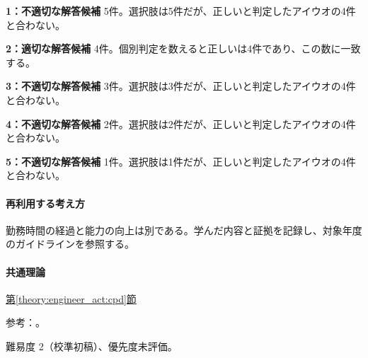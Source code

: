 \noindent\textbf{1：不適切な解答候補} 5件。選択肢は5件だが、正しいと判定したアイウオの4件と合わない。\par

\noindent\textbf{2：適切な解答候補} 4件。個別判定を数えると正しいは4件であり、この数に一致する。\par

\noindent\textbf{3：不適切な解答候補} 3件。選択肢は3件だが、正しいと判定したアイウオの4件と合わない。\par

\noindent\textbf{4：不適切な解答候補} 2件。選択肢は2件だが、正しいと判定したアイウオの4件と合わない。\par

\noindent\textbf{5：不適切な解答候補} 1件。選択肢は1件だが、正しいと判定したアイウオの4件と合わない。\par

\paragraph{再利用する考え方} 勤務時間の経過と能力の向上は別である。学んだ内容と証拠を記録し、対象年度のガイドラインを参照する。

\paragraph{共通理論} \hyperref[theory:engineer_act:cpd]{第\ref*{theory:engineer_act:cpd}節}

\par 参考：\cite{cpd_new2021,cpd_v3}。

\par 難易度 2（校準初稿）、優先度未評価。
